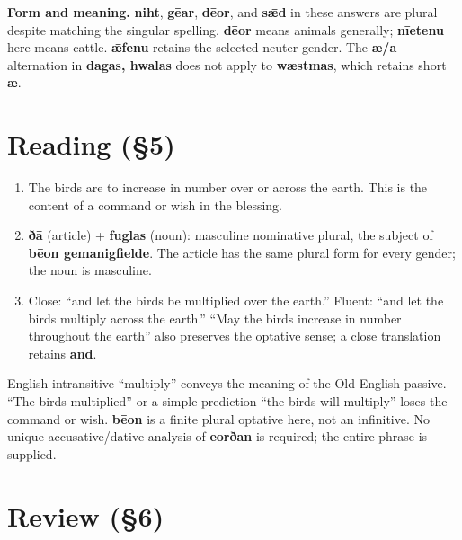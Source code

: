 \textbf{Form and meaning.} \textbf{niht}, \textbf{gēar}, \textbf{dēor}, and \textbf{sǣd} in these answers are plural despite matching the singular spelling. \textbf{dēor} means animals generally; \textbf{nīetenu} here means cattle. \textbf{ǣfenu} retains the selected neuter gender. The \textbf{æ/a} alternation in \textbf{dagas, hwalas} does not apply to \textbf{wæstmas}, which retains short \textbf{æ}.


\section*{Reading (§5)}


\begin{enumerate}
\item[1.] The birds are to increase in number over or across the earth. This is the content of a command or wish in the blessing.
\item[2.] \textbf{ðā} (article) + \textbf{fuglas} (noun): masculine nominative plural, the subject of \textbf{bēon gemanigfielde}. The article has the same plural form for every gender; the noun is masculine.
\item[3.] Close: “and let the birds be multiplied over the earth.” Fluent: “and let the birds multiply across the earth.” “May the birds increase in number throughout the earth” also preserves the optative sense; a close translation retains \textbf{and}.
\end{enumerate}


English intransitive “multiply” conveys the meaning of the Old English passive. “The birds multiplied” or a simple prediction “the birds will multiply” loses the command or wish. \textbf{bēon} is a finite plural optative here, not an infinitive. No unique accusative/dative analysis of \textbf{eorðan} is required; the entire phrase is supplied.


\section*{Review (§6)}


